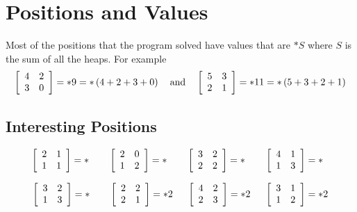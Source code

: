 \documentclass[11pt]{article}
\begin{document}
\section{Positions and Values}

Most of the positions that the program solved have values that are $\ast S$ where $S$ is the sum of all the heaps.  For example
$$
\left[
\begin{array}{ c c }
4 & 2 \\
3 & 0
\end{array}
\right]
= \ast 9 = \ast \left( 4 + 2 + 3 + 0 \right)
\mbox{\hspace{0.1in} and \hspace{0.1in}}
\left[
\begin{array}{ c c }
5 & 3 \\
2 & 1
\end{array}
\right]
= \ast 11 = \ast \left( 5 + 3 + 2 + 1\right)
$$
\subsection{Interesting Positions}
$$
\left[
\begin{array}{ c c }
2 & 1 \\
1 & 1
\end{array}
\right]
= \ast \;\; \hspace{0.2in}
\left[
\begin{array}{ c c }
2 & 0 \\
1 & 2
\end{array}
\right]
= \ast \;\; \hspace{0.2in}
\left[
\begin{array}{ c c }
3 & 2 \\
2 & 2
\end{array}
\right]
= \ast \;\; \hspace{0.2in}
\left[
\begin{array}{ c c }
4 & 1 \\
1 & 3
\end{array}
\right]
= \ast \;\;
$$

$$
\left[
\begin{array}{ c c }
3 & 2 \\
1 & 3
\end{array}
\right]
= \ast \;\; \hspace{0.2in}
\left[
\begin{array}{ c c }
2 & 2 \\
2 & 1
\end{array}
\right]
= \ast 2 \hspace{0.2in}
\left[
\begin{array}{ c c }
4 & 2 \\
2 & 3
\end{array}
\right]
= \ast 2 \hspace{0.2in}
\left[
\begin{array}{ c c }
3 & 1 \\
1 & 2
\end{array}
\right]
= \ast 2
$$
\end{document}

